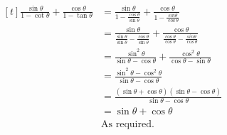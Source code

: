 \documentclass[../main.tex]{subfiles}
\begin{document}
\begin{enumerate}
\begin{spacing}{1.5}
    $
    \!
    \begin{aligned}[t]
        \frac{\sin{\theta}}{1-\cot{\theta}}+\frac{\cos{\theta}}{1-\tan{\theta}}
        &=\frac{\sin{\theta}}{1-\frac{\cos{\theta}}{\sin{\theta}}}+\frac{\cos{\theta}}{1-\frac{sin{\theta}}{\cos{\theta}}}\\
        &=\frac{\sin{\theta}}{\frac{\sin{\theta}}{\sin{\theta}}-\frac{\cos{\theta}}{\sin{\theta}}}+\frac{\cos{\theta}}{\frac{\cos{\theta}}{\cos{\theta}}-\frac{sin{\theta}}{\cos{\theta}}}\\
        &=\frac{\sin^2{\theta}}{\sin{\theta}-\cos{\theta}}+\frac{\cos^2{\theta}}{\cos{\theta}-\sin{\theta}}\\
        &=\frac{\sin^2{\theta}-\cos^2{\theta}}{\sin{\theta}-\cos{\theta}}\\
        &=\frac{(\sin{\theta}+\cos{\theta})(\sin{\theta}-\cos{\theta})}{\sin{\theta}-\cos{\theta}}\\
        &=\sin{\theta}+\cos{\theta}\\
        &\text{As required.}
    \end{aligned}
    $
\end{spacing}  
\end{enumerate}
\end{document}
